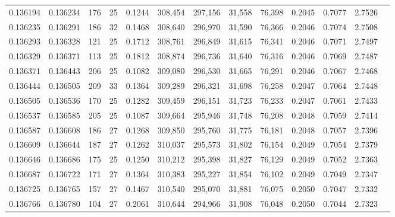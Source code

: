 \begin{tabular}{rrrrrrrrrrrrr}
0.136194 & 0.136234 & 176 &  25 &                                     0.1244 & 308,454 & 297,156 &  31,558 &  76,398 & 0.2045 & 0.7077 & 2.7526 \\
0.136235 & 0.136291 & 186 &  32 &                                     0.1468 & 308,640 & 296,970 &  31,590 &  76,366 & 0.2046 & 0.7074 & 2.7508 \\
0.136293 & 0.136328 & 121 &  25 &                                     0.1712 & 308,761 & 296,849 &  31,615 &  76,341 & 0.2046 & 0.7071 & 2.7497 \\
0.136329 & 0.136371 & 113 &  25 &                                     0.1812 & 308,874 & 296,736 &  31,640 &  76,316 & 0.2046 & 0.7069 & 2.7487 \\
0.136371 & 0.136443 & 206 &  25 &                                     0.1082 & 309,080 & 296,530 &  31,665 &  76,291 & 0.2046 & 0.7067 & 2.7468 \\
0.136444 & 0.136505 & 209 &  33 &                                     0.1364 & 309,289 & 296,321 &  31,698 &  76,258 & 0.2047 & 0.7064 & 2.7448 \\
0.136505 & 0.136536 & 170 &  25 &                                     0.1282 & 309,459 & 296,151 &  31,723 &  76,233 & 0.2047 & 0.7061 & 2.7433 \\
0.136537 & 0.136585 & 205 &  25 &                                     0.1087 & 309,664 & 295,946 &  31,748 &  76,208 & 0.2048 & 0.7059 & 2.7414 \\
0.136587 & 0.136608 & 186 &  27 &                                     0.1268 & 309,850 & 295,760 &  31,775 &  76,181 & 0.2048 & 0.7057 & 2.7396 \\
0.136609 & 0.136644 & 187 &  27 &                                     0.1262 & 310,037 & 295,573 &  31,802 &  76,154 & 0.2049 & 0.7054 & 2.7379 \\
0.136646 & 0.136686 & 175 &  25 &                                     0.1250 & 310,212 & 295,398 &  31,827 &  76,129 & 0.2049 & 0.7052 & 2.7363 \\
0.136687 & 0.136722 & 171 &  27 &                                     0.1364 & 310,383 & 295,227 &  31,854 &  76,102 & 0.2049 & 0.7049 & 2.7347 \\
0.136725 & 0.136765 & 157 &  27 &                                     0.1467 & 310,540 & 295,070 &  31,881 &  76,075 & 0.2050 & 0.7047 & 2.7332 \\
0.136766 & 0.136780 & 104 &  27 &                                     0.2061 & 310,644 & 294,966 &  31,908 &  76,048 & 0.2050 & 0.7044 & 2.7323 \\

\end{tabular}
